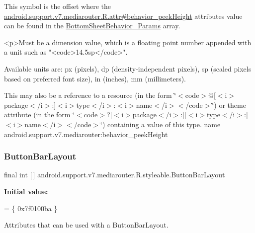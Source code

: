 This symbol is the offset where the \hyperlink{classandroid_1_1support_1_1v7_1_1mediarouter_1_1R_1_1attr_a22ea1cdcd26bdaebdc3307110a925768}{android.\+support.\+v7.\+mediarouter.\+R.\+attr\#behavior\+\_\+peek\+Height} attribute\textquotesingle{}s value can be found in the \hyperlink{classandroid_1_1support_1_1v7_1_1mediarouter_1_1R_1_1styleable_a79256b2584517e9cb65dff8f9bc2bb71}{Bottom\+Sheet\+Behavior\+\_\+\+Params} array.

\begin{DoxyVerb}      <p>Must be a dimension value, which is a floating point number appended with a unit such as "<code>14.5sp</code>".
\end{DoxyVerb}
 Available units are\+: px (pixels), dp (density-\/independent pixels), sp (scaled pixels based on preferred font size), in (inches), mm (millimeters). 

This may also be a reference to a resource (in the form \char`\"{}$<$code$>$@\mbox{[}$<$i$>$package$<$/i$>$\+:\mbox{]}$<$i$>$type$<$/i$>$\+:$<$i$>$name$<$/i$>$$<$/code$>$\char`\"{}) or theme attribute (in the form \char`\"{}$<$code$>$?\mbox{[}$<$i$>$package$<$/i$>$\+:\mbox{]}\mbox{[}$<$i$>$type$<$/i$>$\+:\mbox{]}$<$i$>$name$<$/i$>$$<$/code$>$\char`\"{}) containing a value of this type.  name android.\+support.\+v7.\+mediarouter\+:behavior\+\_\+peek\+Height \mbox{\label{classandroid_1_1support_1_1v7_1_1mediarouter_1_1R_1_1styleable_a593f0c0986a9c8a483e9872a27fb061d}} 
\subsubsection{\texorpdfstring{Button\+Bar\+Layout}{ButtonBarLayout}}
{\footnotesize\ttfamily final int \mbox{[}$\,$\mbox{]} android.\+support.\+v7.\+mediarouter.\+R.\+styleable.\+Button\+Bar\+Layout\hspace{0.3cm}{\ttfamily [static]}}

{\bfseries Initial value\+:}
\begin{DoxyCode}
= \{
            0x7f0100ba
        \}
\end{DoxyCode}
Attributes that can be used with a Button\+Bar\+Layout. 

